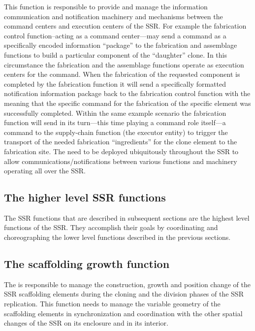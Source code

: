 This function is responsible to
provide and manage the information communication and notification
machinery and mechanisms between the command centers and execution
centers of the SSR. For example the fabrication control 
function--acting as a command center---may send a command as a specifically
encoded information “package”  to the fabrication and assemblage
functions to build a particular component of the “daughter” clone. In
this circumstance the fabrication and the assemblage functions operate
as execution centers for the command. When the fabrication of the
requested component is completed by the fabrication function it will
send a specifically formatted notification information package back to
the fabrication control function with the meaning that the specific
command for the fabrication of the specific element was successfully
completed. Within the same example scenario the fabrication function
will send in its turn---this time playing a command role itself---a
command to the supply-chain function (the executor entity) to trigger
the transport of the needed fabrication “ingredients” for the clone
element to the fabrication site. The  
need to be deployed ubiquitously throughout the
SSR to allow communications/notifications between various functions and
machinery operating all over the SSR.

\subsection[The higher level SSR functions]{The higher level SSR
functions}

The SSR functions that are
described in subsequent sections are the highest level functions of the
SSR. They accomplish their goals by coordinating and choreographing the
lower level functions described in the previous sections.

\subsection[The scaffolding growth function]{The scaffolding growth
function}

The  
is responsible to manage the construction, growth and
position change of the SSR scaffolding elements during the cloning and
the division phases of the SSR replication. This function needs to
manage the variable geometry of the scaffolding elements in
synchronization and coordination with the other spatial changes of the
SSR on its enclosure and in its interior.

